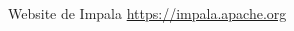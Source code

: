 % 

\begin{thebibliography}{99}


	\emph{} Website de  Impala \url{https://impala.apache.org}	
\end{thebibliography}
